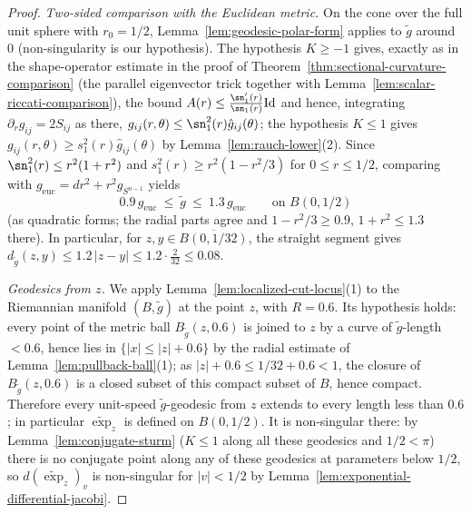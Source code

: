\begin{proof}
\emph{Two-sided comparison with the Euclidean metric.} On the cone
over the full unit sphere with $r_0=1/2$,
Lemma~\ref{lem:geodesic-polar-form} applies to $\tilde g$ around
$0$ (non-singularity is our hypothesis). The hypothesis $K\ge-1$
gives, exactly as in the shape-operator estimate in the proof of
Theorem~\ref{thm:sectional-curvature-comparison} (the parallel
eigenvector trick together with
Lemma~\ref{lem:scalar-riccati-comparison}), the bound $A(r)\le
\frac{\sn_1'(r)}{\sn_1(r)}\mathrm{Id}$ and hence, integrating
$\partial_rg_{ij}=2S_{ij}$ as there,
$g_{ij}(r,\theta)\le\sn_1^2(r)\hat g_{ij}(\theta)$; the hypothesis
$K\le1$ gives $g_{ij}(r,\theta)\ge s_1^2(r)\hat g_{ij}(\theta)$ by
Lemma~\ref{lem:rauch-lower}(2). Since
$\sn_1^2(r)\le r^2(1+r^2)$ and $s_1^2(r)\ge r^2(1-r^2/3)$ for
$0\le r\le 1/2$, comparing with
$g_{\mathrm{euc}}=dr^2+r^2g_{S^{n-1}}$ yields
\begin{equation}\label{twosided}
0.9\,g_{\mathrm{euc}}\ \le\ \tilde g\ \le\ 1.3\,g_{\mathrm{euc}}
\qquad\text{on }B(0,1/2)
\end{equation}
(as quadratic forms; the radial parts agree and
$1-r^2/3\ge0.9$, $1+r^2\le1.3$ there). In particular, for
$z,y\in\overline{B(0,1/32)}$, the straight segment gives
$d_{\tilde g}(z,y)\le1.2\,|z-y|\le1.2\cdot\tfrac{2}{32}\le0.08$.

\emph{Geodesics from $z$.} We apply
Lemma~\ref{lem:localized-cut-locus}(1) to the Riemannian manifold
$(B,\tilde g)$ at the point $z$, with $R=0.6$. Its hypothesis
holds: every point of the metric ball $B_{\tilde g}(z,0.6)$ is
joined to $z$ by a curve of $\tilde g$-length $<0.6$, hence lies
in $\{|x|\le|z|+0.6\}$ by the radial estimate of
Lemma~\ref{lem:pullback-ball}(1); as $|z|+0.6\le1/32+0.6<1$, the
closure of $B_{\tilde g}(z,0.6)$ is a closed subset of this
compact subset of $B$, hence compact. Therefore every unit-speed
$\tilde g$-geodesic from $z$ extends to every length less than
$0.6$; in particular $\widetilde\exp_z$ is defined on $B(0,1/2)$.
It is non-singular there: by Lemma~\ref{lem:conjugate-sturm}
($K\le1$ along all these geodesics and $1/2<\pi$) there is no
conjugate point along any of these geodesics at parameters
below $1/2$, so $d(\widetilde\exp_z)_v$ is non-singular for
$|v|<1/2$ by Lemma~\ref{lem:exponential-differential-jacobi}.


\end{proof}
